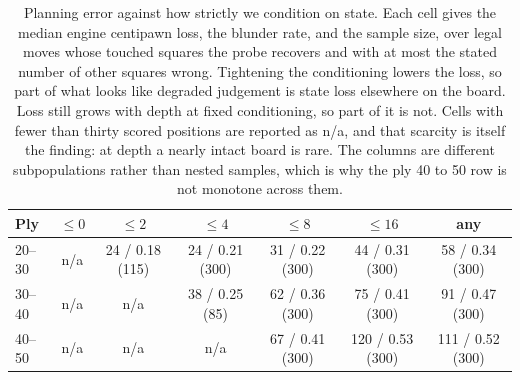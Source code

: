 \begin{table}[t]
\centering\small
\caption{Planning error against how strictly we condition on state. Each
cell gives the median engine centipawn loss, the blunder rate, and the
sample size, over legal moves whose touched squares the probe recovers and
with at most the stated number of other squares wrong. Tightening the
conditioning lowers the loss, so part of what looks like degraded judgement
is state loss elsewhere on the board. Loss still grows with depth at fixed
conditioning, so part of it is not. Cells with fewer than thirty scored
positions are reported as n/a, and that scarcity is itself the finding:
at depth a nearly intact board is rare. The columns are different
subpopulations rather than nested samples, which is why the ply 40 to 50
row is not monotone across them.}
\label{tab:strict}
\begin{tabular}{lcccccc}
\toprule
Ply & $\leq 0$ & $\leq 2$ & $\leq 4$ & $\leq 8$ & $\leq 16$ & any \\
\midrule
20--30 & n/a & 24 / 0.18 (115) & 24 / 0.21 (300) & 31 / 0.22 (300) & 44 / 0.31 (300) & 58 / 0.34 (300) \\
30--40 & n/a & n/a & 38 / 0.25 (85) & 62 / 0.36 (300) & 75 / 0.41 (300) & 91 / 0.47 (300) \\
40--50 & n/a & n/a & n/a & 67 / 0.41 (300) & 120 / 0.53 (300) & 111 / 0.52 (300) \\
\bottomrule
\end{tabular}
\end{table}
